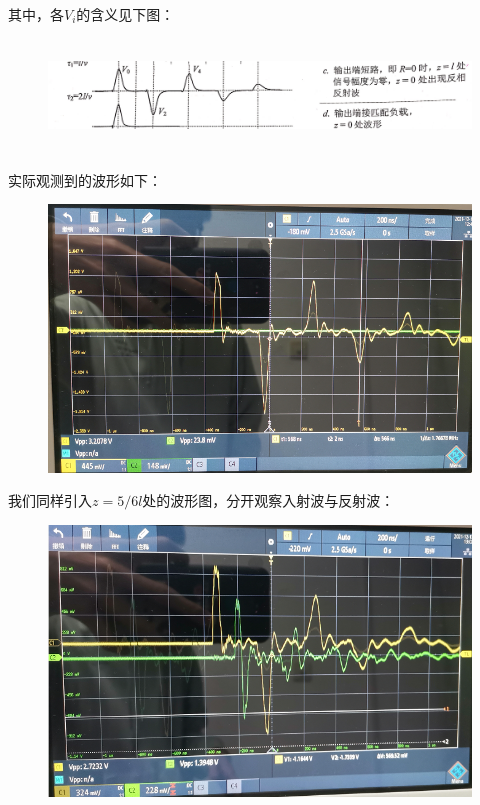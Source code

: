 \documentclass[UTF8]{ctexart}
\begin{document}
其中，各$V_i$的含义见下图：
\begin{figure}[H]
    \centering
    \includegraphics[width=15cm,height=3cm]{9}      
\end{figure}
实际观测到的波形如下：

\begin{figure}[H]\begin{center}
    \includegraphics[scale=0.7]{33.PNG}
\end{center}\end{figure}
我们同样引入$z=5/6l$处的波形图，分开观察入射波与反射波：

\begin{figure}[H]\begin{center}
    \includegraphics[scale=0.7]{34.PNG}
\end{center}\end{figure}
\end{document}
